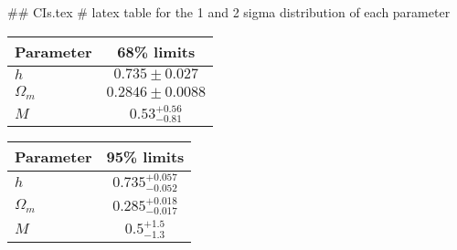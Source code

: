 ## CIs.tex
# latex table for the 1 and 2 sigma distribution of each parameter

\begin{tabular} { l  c}
 Parameter &  68\% limits\\
\hline
{\boldmath$h              $} & $0.735\pm 0.027            $\\
{\boldmath$\Omega_m       $} & $0.2846\pm 0.0088          $\\
{\boldmath$M              $} & $0.53^{+0.56}_{-0.81}      $\\
\hline
\end{tabular}

\begin{tabular} { l  c}
 Parameter &  95\% limits\\
\hline
{\boldmath$h              $} & $0.735^{+0.057}_{-0.052}   $\\
{\boldmath$\Omega_m       $} & $0.285^{+0.018}_{-0.017}   $\\
{\boldmath$M              $} & $0.5^{+1.5}_{-1.3}         $\\
\hline
\end{tabular}
